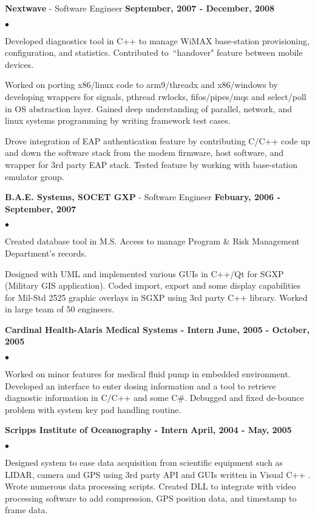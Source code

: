 \documentclass[margin,line]{res}
\newenvironment{list2}{
  \begin{list}{$\bullet$}{%
      \setlength{\itemsep}{0in}
      \setlength{\parsep}{0in} \setlength{\parskip}{0in}
      \setlength{\topsep}{0in} \setlength{\partopsep}{0in} 
      \setlength{\leftmargin}{0.2in}}}{\end{list}}
\begin{document}
\begin{resume}
{\bf Nextwave} - Software Engineer \hfill {\bf September, 2007 - December, 2008} \\
\begin{list2}
\item Developed diagnostics tool in C++ to manage WiMAX base-station provisioning, configuration, and statistics.  Contributed to ``handover" feature between mobile devices.

\item Worked on porting x86/linux code to arm9/threadx and x86/windows by developing wrappers for signals, pthread rwlocks, fifos/pipes/mqs and select/poll in OS abstraction layer.  Gained deep understanding of parallel, network, and linux systems programming by writing framework test cases.

\item Drove integration of EAP authentication feature by contributing C/C++ code up and down the software stack from the modem firmware, host software, and wrapper for 3rd party EAP stack. Tested feature by working with base-station emulator group.  

\end{list2}

{\bf B.A.E. Systems, SOCET GXP} - Software Engineer \hfill {\bf Febuary, 2006 - September, 2007} \\

\begin{list2}
\item Created database tool in M.S. Access to manage Program \& Risk Management Department's records.
\item Designed with UML and implemented various GUIs in C++/Qt for SGXP (Military GIS application).  Coded import, export and some display capabilities for Mil-Std 2525 graphic overlays in SGXP using 3rd party C++ library.  Worked in large team of 50 engineers.
\end{list2}

{\bf Cardinal Health-Alaris Medical Systems - Intern} \hfill {\bf June, 2005 - October, 2005}
\begin{list2}
\item Worked on minor features for medical fluid pump in embedded environment.  Developed an interface to enter dosing information and a tool to retrieve diagnostic information in C/C++ and some C#.  Debugged and fixed de-bounce problem with system key pad handling routine.
\end{list2} 

{\bf Scripps Institute of Oceanography - Intern} \hfill {\bf April, 2004 - May, 2005}
\begin{list2}
\item Designed system to ease data acquisition from scientific equipment such as LIDAR, camera and GPS using 3rd party API and GUIs written in Visual C++ .  Wrote numerous data processing scripts.  Created DLL to integrate with video processing software to add compression, GPS position data, and timestamp to frame data.
\end{list2} 


\end{resume}
\end{document}
